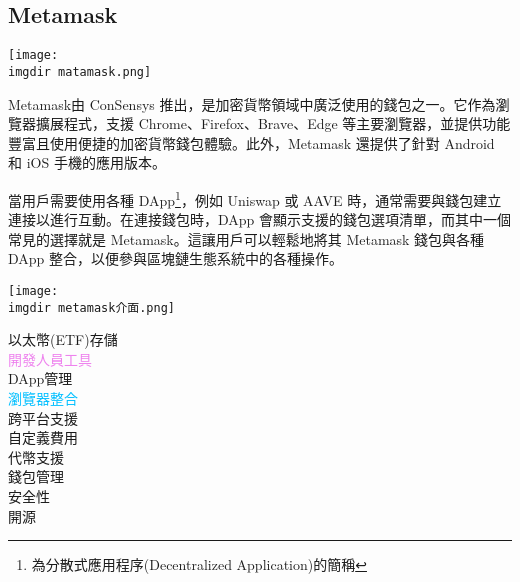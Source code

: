 \subsection{\R Metamask}
\begin{minipage}{.4\linewidth}
        \texttt{[image: \\imgdir matamask.png]}
        \label{matamask}
\end{minipage}
\begin{minipage}{.6\linewidth}
Metamask由 ConSensys 推出，是加密貨幣領域中廣泛使用的錢包之一。它作為瀏覽器擴展程式，支援 Chrome、Firefox、Brave、Edge 等主要瀏覽器，並提供功能豐富且使用便捷的加密貨幣錢包體驗。此外，Metamask 還提供了針對 Android 和 iOS 手機的應用版本。
\end{minipage}
\begin{minipage}{.6\linewidth}
當用戶需要使用各種 DApp\footnote{為分散式應用程序(Decentralized Application)的簡稱}，例如 Uniswap 或 AAVE 時，通常需要與錢包建立連接以進行互動。在連接錢包時，DApp 會顯示支援的錢包選項清單，而其中一個常見的選擇就是 Metamask。這讓用戶可以輕鬆地將其 Metamask 錢包與各種 DApp 整合，以便參與區塊鏈生態系統中的各種操作。
\end{minipage}
\begin{minipage}{.4\linewidth}
        \texttt{[image: \\imgdir metamask介面.png]}
        \label{metamask介面}
\end{minipage}
\begin{center}
\textcolor {usccardinal}{\Huge {以太幣(ETF)存儲}}\\
\textcolor {violet}{\huge{開發人員工具}}\\
\textcolor {navyblue}{\LARGE{DApp管理}}\\
\textcolor {deepskyblue}{\Large{瀏覽器整合}}\\
\textcolor {lime(web)(x11green)}{\large{跨平台支援}}\\
\textcolor {fluorescentyellow}{\normalsize{自定義費用}}\\
\textcolor {citrine}{\small{代幣支援}}\\
\textcolor {amber(sae/ece)}{\footnotesize{錢包管理}}\\
\textcolor {ruddy}{\scriptsize{安全性}}\\
\textcolor {razzledazzlerose}{\tiny{開源}}\\
\normalsize
\end{center}
